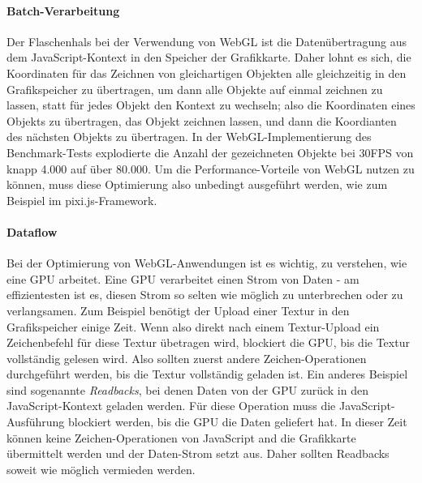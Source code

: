 \documentclass[a4paper, 12pt]{article}
\begin{document}
\paragraph{Batch-Verarbeitung} Der Flaschenhals bei der Verwendung von WebGL ist die Datenübertragung aus dem JavaScript-Kontext in den Speicher der Grafikkarte. Daher lohnt es sich, die Koordinaten für das Zeichnen von gleichartigen Objekten alle gleichzeitig in den Grafikspeicher zu übertragen, um dann alle Objekte auf einmal zeichnen zu lassen, statt für jedes Objekt den Kontext zu wechseln; also die Koordinaten eines Objekts zu übertragen, das Objekt zeichnen lassen, und dann die Koordianten des nächsten Objekts zu übertragen. In der WebGL-Implementierung des Benchmark-Tests explodierte die Anzahl der gezeichneten Objekte bei 30FPS von knapp 4.000 auf über 80.000. Um die Performance-Vorteile von WebGL nutzen zu können, muss diese Optimierung also unbedingt ausgeführt werden, wie zum Beispiel im pixi.js-Framework.
\paragraph{Dataflow} Bei der Optimierung von WebGL-Anwendungen ist es wichtig, zu verstehen, wie eine GPU arbeitet. Eine GPU verarbeitet einen Strom von Daten - am effizientesten ist es, diesen Strom so selten wie möglich zu unterbrechen oder zu verlangsamen. Zum Beispiel benötigt der Upload einer Textur in den Grafikspeicher einige Zeit. Wenn also direkt nach einem Textur-Upload ein Zeichenbefehl für diese Textur übetragen wird, blockiert die GPU, bis die Textur vollständig gelesen wird. Also sollten zuerst andere Zeichen-Operationen durchgeführt werden, bis die Textur vollständig geladen ist. Ein anderes Beispiel sind sogenannte \emph{Readbacks}, bei denen Daten von der GPU zurück in den JavaScript-Kontext geladen werden. Für diese Operation muss die JavaScript-Ausführung blockiert werden, bis die GPU die Daten geliefert hat. In dieser Zeit können keine Zeichen-Operationen von JavaScript and die Grafikkarte übermittelt werden und der Daten-Strom setzt aus. Daher sollten Readbacks soweit wie möglich vermieden werden.
\end{document}
